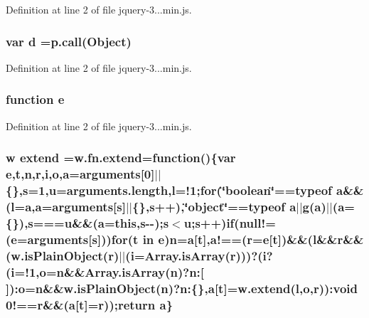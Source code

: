Definition at line 2 of file jquery-\/3...\+min.\+js.

\subsubsection[{d}]{\setlength{\rightskip}{0pt plus 5cm}var d =p.\+call(Object)}\label{jquery-3_83_81_8min_8js_aeb337d295abaddb5ec3cb34cc2e2bbc9}


Definition at line 2 of file jquery-\/3...\+min.\+js.

\subsubsection[{e}]{\setlength{\rightskip}{0pt plus 5cm}function e}\label{jquery-3_83_81_8min_8js_a2c038346d47955cbe2cb91e338edd7e1}


Definition at line 2 of file jquery-\/3...\+min.\+js.

\subsubsection[{extend}]{ {\bf w} extend =w.\+fn.\+extend=function()\{var {\bf e},{\bf t},{\bf n},{\bf r},{\bf i},{\bf o},{\bf a}=arguments[0]$\vert$$\vert$\{\},{\bf s}=1,{\bf u}=arguments.\+length,{\bf l}=!1;for(\char`\"{}boolean\char`\"{}==typeof {\bf a}\&\&({\bf l}={\bf a},{\bf a}=arguments[{\bf s}]$\vert$$\vert$\{\},{\bf s}++),\char`\"{}object\char`\"{}==typeof {\bf a}$\vert$$\vert${\bf g}({\bf a})$\vert$$\vert$({\bf a}=\{\}),{\bf s}==={\bf u}\&\&({\bf a}=this,{\bf s}-\/-\/);{\bf s}$<${\bf u};{\bf s}++)if(null!=({\bf e}=arguments[{\bf s}]))for({\bf t} in {\bf e}){\bf n}={\bf a}[{\bf t}],a!==({\bf r}={\bf e}[{\bf t}])\&\&({\bf l}\&\&{\bf r}\&\&(w.\+is\+Plain\+Object({\bf r})$\vert$$\vert$({\bf i}=Array.\+is\+Array({\bf r})))?({\bf i}?({\bf i}=!1,{\bf o}={\bf n}\&\&Array.\+is\+Array({\bf n})?n\+:[$\,$])\+:{\bf o}={\bf n}\&\&w.\+is\+Plain\+Object({\bf n})?n\+:\{\},{\bf a}[{\bf t}]=w.\+extend({\bf l},{\bf o},{\bf r}))\+:void 0!=={\bf r}\&\&({\bf a}[{\bf t}]={\bf r}));return {\bf a}\}}\label{jquery-3_83_81_8min_8js_acb0a3c5d7aebc85506c33b7ad6d9a319}


